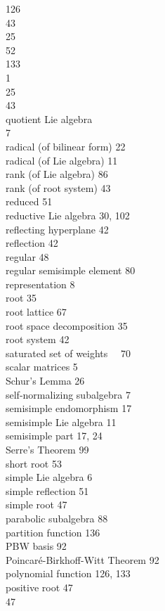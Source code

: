\documentclass[10pt]{article}
\begin{document}
126\\
43\\
25\\
52\\
133\\
1\\
25\\
43\\
quotient Lie algebra\\
7\\
radical (of bilinear form) 22\\
radical (of Lie algebra) 11\\
rank (of Lie algebra) 86\\
rank (of root system) 43\\
reduced 51\\
reductive Lie algebra 30, 102\\
reflecting hyperplane 42\\
reflection 42\\
regular 48\\
regular semisimple element 80\\
representation 8\\
root 35\\
root lattice 67\\
root space decomposition 35\\
root system 42\\
saturated set of weights $\quad 70$\\
scalar matrices 5\\
Schur's Lemma 26\\
self-normalizing subalgebra 7\\
semisimple endomorphism 17\\
semisimple Lie algebra 11\\
semisimple part 17, 24\\
Serre's Theorem 99\\
short root 53\\
simple Lie algebra 6\\
simple reflection 51\\
simple root 47\\
parabolic subalgebra 88\\
partition function 136\\
PBW basis 92\\
Poincaré-Birkhoff-Witt Theorem 92\\
polynomial function 126, 133\\
positive root 47\\
47
\end{document}
